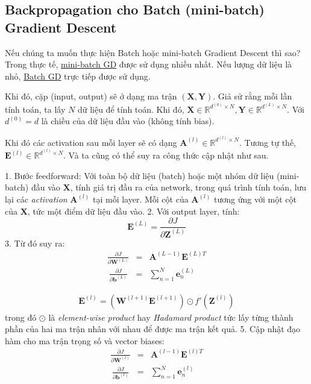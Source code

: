  
\subsection{Backpropagation cho Batch (mini-batch) Gradient Descent}
 
Nếu chúng ta muốn thực hiện Batch hoặc mini-batch Gradient Descent thì sao? Trong thực tế, \href{http://machinelearningcoban.com/2017/01/16/gradientdescent2/#-mini-batch-gradient-descent}{mini-batch GD} được sử dụng nhiều nhất. Nếu lượng dữ liệu là nhỏ, \href{http://machinelearningcoban.com/2017/01/16/gradientdescent2/#-batch-gradient-descent}{Batch GD} trực tiếp được sử dụng. 
 
Khi đó, cặp (input, output) sẽ ở dạng ma trận $(\mathbf{X, Y})$. Giả sử rằng mỗi lần tính toán, ta lấy $N$ dữ liệu để tính toán. Khi đó, $\mathbf{X} \in \mathbb{R}^{d^{(0)} \times N}, \mathbf{Y} \in \mathbb{R}^{d^{(L)}\times N}$. Với $d^{(0)} = d$ là chiều của dữ liệu đầu vào (không tính bias). 
 
 Khi đó các activation sau mỗi layer sẽ có dạng $\mathbf{A}^{(l)} \in \mathbb{R}^{d^{(l)} \times N}$. Tương tự thế, $\mathbf{E}^{(l)} \in \mathbb{R}^{d^{(l)}\times N}$. Và ta cũng có thể suy ra công thức cập nhật như sau. 
 
 1. Bước feedforward: Với toàn bộ dữ liệu (batch) hoặc một nhóm dữ liệu (mini-batch) đầu vào $\mathbf{X}$, tính giá trị đầu ra của network, trong quá trình tính toán, lưu lại các \textit{activation} $\mathbf{A}^{(l)}$ tại mỗi layer. Mỗi cột của $\mathbf{A}^{(l)}$ tương ứng với một cột của $\mathbf{X}$, tức một điểm dữ liệu đầu vào. 
 2. Với output layer, tính: \begin{equation*}\mathbf{E}^{(L)} = \frac{\partial J}{\partial \mathbf{Z}^{(L)}}\end{equation*} 
 3. Từ đó suy ra: 
    \begin{eqnarray}
        \frac{\partial J}{\partial \mathbf{W}^{(L)}} &=&  \mathbf{A}^{(L-1)}\mathbf{E}^{(L)T}\\\ 
        \frac{\partial J}{\partial \mathbf{b}^{(L)}} &=&  \sum_{n=1}^N\mathbf{e}_n^{(L)} 
    \end{eqnarray} 

    \begin{eqnarray} 
        \mathbf{E}^{(l)} = \left( \mathbf{W}^{(l+1)} \mathbf{E}^{(l+1)} \right) \odot f'(\mathbf{Z}^{(l)}) 
    \end{eqnarray} 
 trong đó $\odot$ là \textit{element-wise product} hay \textit{Hadamard product} tức lấy từng thành phần của hai ma trận nhân với nhau để được ma trận kết quả. 
 5. Cập nhật đạo hàm cho ma trận trọng số và vector biases: 
 \begin{eqnarray}
 \frac{\partial J}{\partial \mathbf{W}^{(l)}} &=&  \mathbf{A}^{(l-1)}\mathbf{E}^{(l)T}\\\ 
 \frac{\partial J}{\partial \mathbf{b}^{(l)}} &=&  \sum_{n=1}^N\mathbf{e}_n^{(l)} 
 \end{eqnarray} 
 
